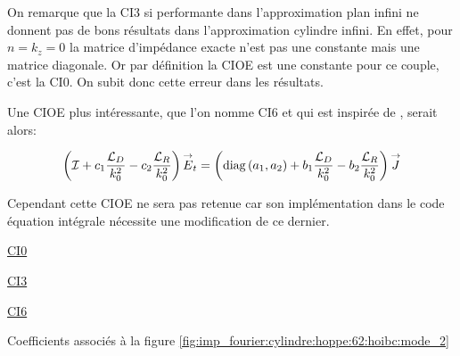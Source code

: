   On remarque que la CI3 si performante dans l'approximation plan infini ne donnent pas de bons résultats dans l’approximation cylindre infini. 
  En effet, pour \(n=k_z=0\) la matrice d'impédance exacte n'est pas une constante mais une matrice diagonale. 
  Or par définition la CIOE est une constante pour ce couple, c'est la CI0. On subit donc cette erreur dans les résultats. 

  Une CIOE plus intéressante, que l'on nomme CI6 et qui est inspirée de \cite[p.~60]{hoppe_impedance_1995}, serait alors:

  \begin{equation*}
    \left({\mathcal{I}} + c_1\dfrac{{\mathcal{L}_D}}{k_0^2} -c_2\dfrac{{\mathcal{L}_R}}{k_0^2}\right){\overset{\rightarrow}{E}}_t = \left(\operatorname{diag}\left(a_1,a_2\right) + b_1\dfrac{{\mathcal{L}_D}}{k_0^2} - b_2 \dfrac{{\mathcal{L}_R}}{k_0^2} \right){\overset{\rightarrow}{J}}
  \end{equation*}

  Cependant cette CIOE ne sera pas retenue car son implémentation dans le code équation intégrale nécessite une modification de ce dernier.

  \begin{table}[!hbt]
    \centering
    \begin{minipage}[t]{0.49\textwidth}
      \vspace{0pt}
      \centering
      \begin{coefftable}{\hyperlink{ci0}{CI0}}
        
      \end{coefftable}
      \begin{coefftable}{\hyperlink{ci3}{CI3}}
        
      \end{coefftable}
    \end{minipage}
    \begin{minipage}[t]{0.49\textwidth}
      \vspace{0pt}
      \centering
      \begin{coefftable}{\hyperlink{ci6}{CI6}}
        
      \end{coefftable}
    \end{minipage}
    \caption{Coefficients associés à la figure \ref{fig:imp_fourier:cylindre:hoppe:62:hoibc:mode_2}}
    \label{tab:imp_fourier:cylindre:hoppe:62:hoibc:mode_2}
  \end{table}


